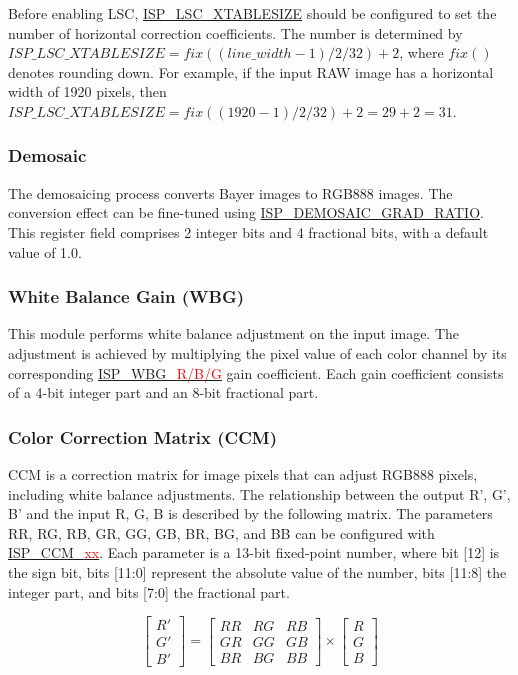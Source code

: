 \documentclass[main\_\_EN.tex]{subfiles}
\begin{document}
Before enabling LSC, \hyperref[fielddesc:ISPLSCXTABLESIZE]{ISP\_LSC\_XTABLESIZE} should be configured to set the number of horizontal correction coefficients. The number is determined by
$ISP\_LSC\_XTABLESIZE = fix((line\_width -1)/2/32) + 2$, where $fix()$ denotes rounding down. For example, if the input RAW image has a horizontal width of 1920 pixels, then $ISP\_LSC\_XTABLESIZE = fix((1920-1)/2/32)+2 = 29+2 = 31$.


\subsubsection{Demosaic}
\label{sec:isp_demosaic}
The demosaicing process converts Bayer images to RGB888 images. The conversion effect can be fine-tuned using \hyperref[fielddesc:ISPDEMOSAICGRADRATIO]{ISP\_DEMOSAIC\_GRAD\_RATIO}. This register field comprises 2 integer bits and 4 fractional bits, with a default value of 1.0.


\subsubsection{White Balance Gain (WBG)}
\label{sec:isp_wbg}
This module performs white balance adjustment on the input image. The adjustment is achieved by multiplying the pixel value of each color channel by its corresponding \hyperref[fielddesc:ISPWBGR]{ISP\_WBG\_\textcolor{red}{R/B/G}} gain coefficient. Each gain coefficient consists of a 4-bit integer part and an 8-bit fractional part.


\subsubsection{Color Correction Matrix (CCM)}
\label{sec:isp_ccm}
CCM is a correction matrix for image pixels that can adjust RGB888 pixels, including white balance adjustments. The relationship between the output R', G', B' and the input R, G, B is described by the following matrix. The parameters RR, RG, RB, GR, GG, GB, BR, BG, and BB can be configured with \hyperref[fielddesc:ISPCCMRR]{ISP\_CCM\_\textcolor{red}{xx}}. Each parameter is a 13-bit fixed-point number, where bit [12] is the sign bit, bits [11:0] represent the absolute value of the number, bits [11:8] the integer part, and bits [7:0] the fractional part.

\begin{equation}
    \left[\begin{array}{c}
        R' \\
        G' \\
        B'
    \end{array}\right] = \left[\begin{array}{ccc}
        RR & RG & RB \\
        GR & GG & GB \\
        BR & BG & BB
    \end{array}\right]\times\left[\begin{array}{c}
        R \\
        G \\
        B
    \end{array}\right]
\end{equation}
\end{document}
